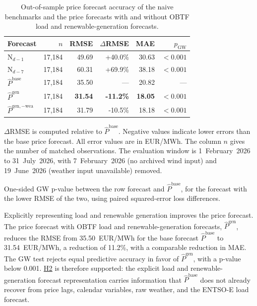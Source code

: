 \begin{table}[htbp]
  \centering
  \small
  \setlength{\tabcolsep}{5.5pt}
  \caption[Price forecast accuracy with and without OBTF forecasts.]
  {Out-of-sample price forecast accuracy of the naive benchmarks and the
  price forecasts with and without OBTF load and renewable-generation forecasts.}
  \label{tab:rq2_price_results}
  \begin{threeparttable}
  \begin{tabular}{@{}lrrrrr@{}}
    \toprule
    Forecast & \(n\) & RMSE & \(\Delta\)RMSE\tnote{a} & MAE
      & \(p_{\mathrm{GW}}\)\tnote{b} \\
    \midrule
    \(\mathrm{N}_{d-1}\)
      & 17,184 & 49.69 & +40.0\% & 30.63 & \(<0.001\) \\
    \(\mathrm{N}_{d-7}\)
      & 17,184 & 60.31 & +69.9\% & 38.18 & \(<0.001\) \\
    \(\hat{P}^{\mathrm{base}}\)
      & 17,184 & 35.50 & --- & 20.82 & --- \\
    \(\hat{P}^{\mathrm{gen}}\)
      & 17,184 & \textbf{31.54} & \textbf{-11.2\%} & \textbf{18.05} & \(<0.001\) \\
    \(\hat{P}^{\mathrm{gen},-\mathrm{wea}}\)
      & 17,184 & 31.79 & -10.5\% & 18.18 & \(<0.001\) \\
    \bottomrule
  \end{tabular}
  \begin{tablenotes}[flushleft]
    \footnotesize
    \item[a] \(\Delta\)RMSE is computed relative to
    \(\hat{P}^{\mathrm{base}}\). Negative values indicate lower errors
    than the base price forecast. All error values are in EUR/MWh. The column
    \(n\) gives the number of matched observations. The evaluation window is
    1~February~2026 to 31~July~2026, with 7~February~2026 (no archived wind
    input) and 19~June~2026 (weather input unavailable) removed.
    \item[b] One-sided GW p-value between the row forecast and
    \(\hat{P}^{\mathrm{base}}\), for the forecast with the lower RMSE of
    the two, using paired squared-error loss differences.
  \end{tablenotes}
  \end{threeparttable}
\end{table}

Explicitly representing load and renewable generation improves the price
forecast. The price forecast with OBTF load and renewable-generation forecasts,
\(\hat{P}^{\mathrm{gen}}\), reduces the RMSE from
35.50~EUR/MWh for the base forecast
\(\hat{P}^{\mathrm{base}}\) to 31.54~EUR/MWh, a
reduction of 11.2\%, with a comparable reduction in MAE. The
GW test rejects equal predictive accuracy in favor of
\(\hat{P}^{\mathrm{gen}}\), with a p-value below 0.001.
\hyperlink{hyp:price_impact_generated_forecasts}{H2} is therefore supported: the explicit load and
renewable-generation forecast representation carries information that
\(\hat{P}^{\mathrm{base}}\) does not already recover from price lags, calendar
variables, raw weather, and the \mbox{ENTSO-E} load forecast.

